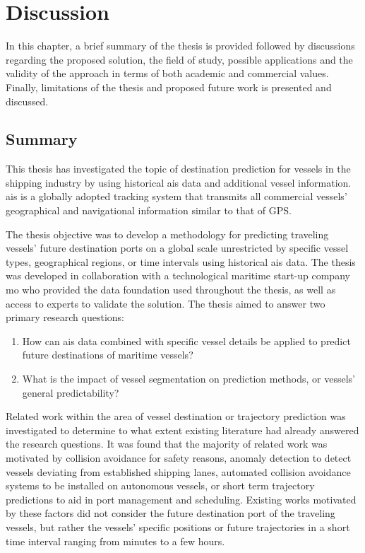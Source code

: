 \chapter{Discussion}
\label{chap:discussion}

In this chapter, a brief summary of the thesis is provided followed by discussions regarding the proposed solution, the field of study, possible applications and the validity of the approach in terms of both academic and commercial values. Finally, limitations of the thesis and proposed future work is presented and discussed.

\section{Summary}
\label{sec:summary}

This thesis has investigated the topic of destination prediction for vessels in the shipping industry by using historical \acrfull{ais} data and additional vessel information. \acrshort{ais} is a globally adopted tracking system that transmits all commercial vessels' geographical and navigational information similar to that of GPS\@.

The thesis objective was to develop a methodology for predicting traveling vessels' future destination ports on a global scale unrestricted by specific vessel types, geographical regions, or time intervals using historical \acrshort{ais} data. The thesis was developed in collaboration with a technological maritime start-up company \acrfull{mo} who provided the data foundation used throughout the thesis, as well as access to experts to validate the solution. The thesis aimed to answer two primary research questions:

\begin{enumerate}
    \item How can \acrshort{ais} data combined with specific vessel details be applied to predict future destinations of maritime vessels?
    \item What is the impact of vessel segmentation on prediction methods, or vessels' general predictability?
\end{enumerate}

Related work within the area of vessel destination or trajectory prediction was investigated to determine to what extent existing literature had already answered the research questions. It was found that the majority of related work was motivated by collision avoidance for safety reasons, anomaly detection to detect vessels deviating from established shipping lanes, automated collision avoidance systems to be installed on autonomous vessels, or short term trajectory predictions to aid in port management and scheduling. Existing works motivated by these factors did not consider the future destination port of the traveling vessels, but rather the vessels' specific positions or future trajectories in a short time interval ranging from minutes to a few hours.

